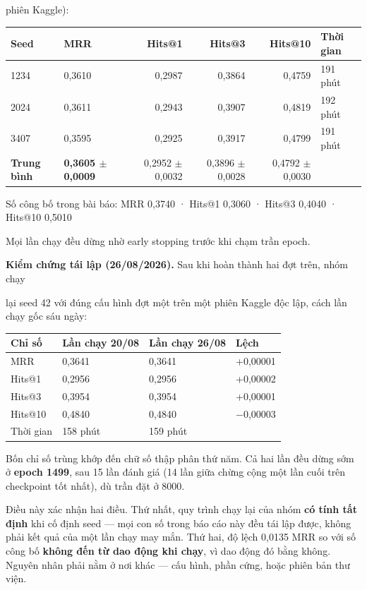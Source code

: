 \documentclass[11pt,a4paper]{article}
\begin{document}
phiên Kaggle):

\begin{center}\small
\begin{tabular}{@{}llrrrl@{}}
\toprule
\textbf{Seed} & \textbf{MRR} & \textbf{Hits@1} & \textbf{Hits@3} & \textbf{Hits@10} & \textbf{Thời gian}\\
\midrule
1234 & 0,3610 & 0,2987 & 0,3864 & 0,4759 & 191 phút\\
2024 & 0,3611 & 0,2943 & 0,3907 & 0,4819 & 192 phút\\
3407 & 0,3595 & 0,2925 & 0,3917 & 0,4799 & 191 phút\\
\textbf{Trung bình} & \textbf{0,3605 $\pm$ 0,0009} & 0,2952 $\pm$ 0,0032 & 0,3896 $\pm$ 0,0028 & 0,4792 $\pm$ 0,0030 & \\
\bottomrule
\end{tabular}
\end{center}
Số công bố trong bài báo: MRR 0,3740 · Hits@1 0,3060 · Hits@3 0,4040 · Hits@10 0,5010

Mọi lần chạy đều dừng nhờ early stopping trước khi chạm trần epoch.

\textbf{Kiểm chứng tái lập (26/08/2026).} Sau khi hoàn thành hai đợt trên, nhóm chạy

lại seed 42 với đúng cấu hình đợt một trên một phiên Kaggle độc lập, cách lần chạy gốc sáu ngày:

\begin{center}\small
\begin{tabular}{@{}llll@{}}
\toprule
\textbf{Chỉ số} & \textbf{Lần chạy 20/08} & \textbf{Lần chạy 26/08} & \textbf{Lệch}\\
\midrule
MRR & 0,3641 & 0,3641 & +0,00001\\
Hits@1 & 0,2956 & 0,2956 & +0,00002\\
Hits@3 & 0,3954 & 0,3954 & +0,00001\\
Hits@10 & 0,4840 & 0,4840 & −0,00003\\
Thời gian & 158 phút & 159 phút & \\
\bottomrule
\end{tabular}
\end{center}
Bốn chỉ số trùng khớp đến chữ số thập phân thứ năm. Cả hai lần đều dừng sớm ở \textbf{epoch 1499}, sau 15 lần đánh giá (14 lần giữa chừng cộng một lần cuối trên checkpoint tốt nhất), dù trần đặt ở 8000.

Điều này xác nhận hai điều. Thứ nhất, quy trình chạy lại của nhóm \textbf{có tính tất định} khi cố định seed --- mọi con số trong báo cáo này đều tái lập được, không phải kết quả của một lần chạy may mắn. Thứ hai, độ lệch 0,0135 MRR so với số công bố \textbf{không đến từ dao động khi chạy}, vì dao động đó bằng không. Nguyên nhân phải nằm ở nơi khác --- cấu hình, phần cứng, hoặc phiên bản thư viện.
\end{document}
